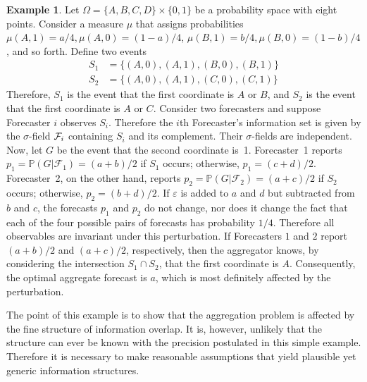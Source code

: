 \documentclass[12pt]{article}
\renewcommand{\P}{\mathbb{P}}
\theoremstyle{definition}
\newtheorem{example}[theorem]{Example}
\theoremstyle{definition}
\def\F{{\cal F}}
\def\P{{\mathbb P}}
\def\ee{\varepsilon}
\begin{document}
\begin{example}
Let $\Omega = \{ A,B,C,D \} \times \{ 0,1 \}$ be a probability space
with eight points.  Consider a measure $\mu$ that assigns
probabilities $\mu (A,1) = a/4, \mu (A,0) = (1-a)/4$, $\mu (B,1) =
b/4, \mu (B,0) = (1-b)/4$, and so forth. Define two events 
\begin{align*}
S_1 &= \{(A,0),(A,1),(B,0),(B,1) \}\\
S_2 &= \{(A,0),(A,1),(C,0),(C,1) \}
\end{align*}
Therefore, $S_1$ is the event that the first coordinate is
$A$ or $B$, and $S_2$ is the event that the first coordinate
is $A$ or $C$. Consider two forecasters and suppose Forecaster $i$ observes $S_i$. Therefore the $i$th Forecaster's information set is
given by the $\sigma$-field $\F_i$ containing $S_i$ and its
complement. Their $\sigma$-fields are independent. Now, let
$G$ be the event that the second coordinate is~1.  Forecaster~1
reports $p_1 = \P(G | \mathcal{F}_1) = (a+b)/2$ if $S_1$ occurs;
otherwise, $p_1 = (c+d)/2$.  Forecaster~2, on the other hand, reports
$p_2 = \P(G | \mathcal{F}_2) = (a+c)/2$ if $S_2$ occurs; otherwise,
$p_2 = (b+d)/2$.  If $\ee$ is added to $a$ and $d$ but subtracted from
$b$ and $c$, the forecasts $p_1$ and $p_2$ do not change, nor does it
change the fact that each of the four possible pairs of forecasts has
probability $1/4$.  Therefore all observables are invariant under
this perturbation.  If Forecasters $1$ and $2$ report $(a+b)/2$ and
$(a+c)/2$, respectively, then the aggregator knows, by considering the
intersection $S_1 \cap S_2$, that the first coordinate is $A$.
Consequently, the optimal aggregate forecast is $a$, which is most
definitely affected by the perturbation.
\end{example}

The point of this example is to show that the aggregation problem is affected
by the fine structure of information overlap.  It is, however, unlikely
that the structure can ever be known with the precision postulated in
this simple example.  Therefore it is necessary to make reasonable
assumptions that yield plausible yet generic information structures.
\end{document}
